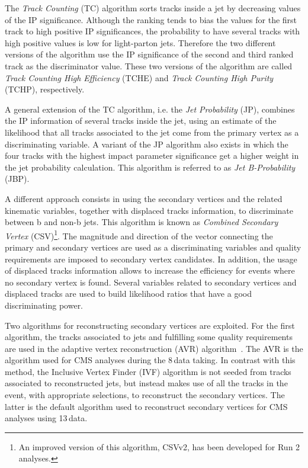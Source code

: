 The \emph{Track Counting} (TC) algorithm sorts tracks inside a jet by decreasing values of the IP significance. Although the ranking tends to bias the values for the first track to high positive IP significances, the probability to have several tracks with high positive values is low for light-parton jets. Therefore the two different versions of the algorithm use the IP significance of the second and third ranked track as the discriminator value.  These two versions of the algorithm are called \emph{Track Counting High Efficiency} (TCHE) and \emph{Track Counting High Purity} (TCHP), respectively.

A general extension of the TC algorithm, i.e. the \emph{Jet Probability} (JP), combines the IP information of several tracks inside the jet, using an estimate of the likelihood that all tracks associated to the jet come from the primary vertex as a discriminating variable. A variant of
the JP algorithm also exists in which the four tracks with the highest impact parameter significance get a higher weight in the jet probability calculation. This algorithm is referred to as \emph{Jet B-Probability} (JBP).

A different approach consists in using the secondary vertices and the related kinematic variables, together with displaced tracks information, to discriminate between b and non-b jets. This algorithm is known as \emph{Combined Secondary Vertex} (CSV)\footnote{An improved version of this algorithm, CSVv2, has been developed for Run 2 analyses.}. The magnitude and direction of the vector connecting the primary and secondary vertices are used as a discriminating variables and quality requirements are imposed to secondary vertex candidates. In addition, the usage of displaced tracks information allows to increase the efficiency for events where no secondary vertex is found. Several variables related to secondary vertices and displaced tracks are used to build likelihood ratios that have a good discriminating power.

Two algorithms for reconstructing secondary vertices are exploited. For the first algorithm, the
tracks associated to jets and fulfilling some quality requirements are used in the adaptive vertex reconstruction (AVR) algorithm~\cite{Waltenberger:1166320}. The AVR is the algorithm used for CMS analyses during the 8\,\TeV data taking. In contrast with this method, the Inclusive Vertex Finder (IVF) algorithm is not seeded from tracks associated to reconstructed jets, but instead makes use of all the tracks in the event, with appropriate selections, to reconstruct the secondary vertices. The latter is the default algorithm used to reconstruct secondary vertices for CMS analyses using 13\,\TeV data.

